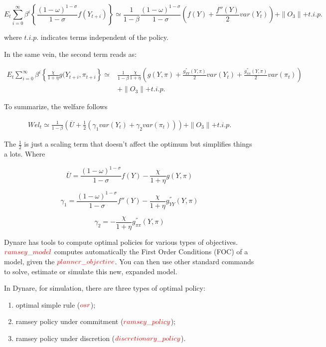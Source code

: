 \documentclass[cn,10pt,math=newtx,citestyle=gb7714-2015,bibstyle=gb7714-2015]{elegantbook}
\begin{document}
	$$E_t \sum_{i=0}^{\infty}\beta^i\left\{\frac{(1-\omega)^{1-\sigma}}{1-\sigma}f(Y_{t+i})\right\}\simeq \frac{1}{1-\beta}\frac{(1-\omega)^{1-\sigma}}{1-\sigma}\left(f(Y)+\frac{f''(Y)}{2}var(Y_t)\right)+\parallel O_3\parallel+t.i.p.$$
	
	where $t.i.p.$ indicates terms independent of the policy.
	
	In the same vein, the second term reads as:
	
	\begin{equation*}
		\begin{split}
			E_t \sum_{i=0}^{\infty}\beta^i\left\{\frac{\chi}{1+\eta}g(Y_{t+i},\pi_{t+i}\right\}\simeq & \frac{1}{1-\beta}\frac{\chi}{1+\eta}\left(g(Y,\pi)+\frac{g_{YY}^{''}(Y,\pi)}{2}var(Y_t)+\frac{g_{\pi \pi}^{''}(Y,\pi)}{2}var(\pi_t)\right)\\
			&+\parallel O_3\parallel+t.i.p.
		\end{split}
	\end{equation*}
	
	To summarize, the welfare follows
	
	\begin{equation*}
		\begin{split}
			Wel_t \simeq  \frac{1}{1-\beta}\left(\overline{U}+\frac{1}{2}\left(\gamma_1 var(Y_t)+\gamma_2 var(\pi_t)\right) \right)+\parallel O_3\parallel+t.i.p.
		\end{split}
	\end{equation*}
	
	The $\frac{1}{2}$ is just a scaling term that doesn't affect the optimum but simplifies things a lots. Where
	
	$$\overline{U}=\frac{(1-\omega)^{1-\sigma}}{1-\sigma}f(Y)-\frac{\chi}{1+\eta}g(Y,\pi)$$
	
	$$\gamma_1=\frac{(1-\omega)^{1-\sigma}}{1-\sigma}f''(Y)-\frac{\chi}{1+\eta}g_{YY}^{''}(Y,\pi)$$
	
	$$\gamma_2=-\frac{\chi}{1+\eta}g_{\pi \pi}^{''}(Y,\pi)$$
	
	Dynare has tools to compute optimal policies for various types of objectives. $\textcolor{red}{ramsey\_model}$ computes automatically the First Order Conditions (FOC) of a model, given the $\textcolor{red}{planner\_objective}$. You can then use other standard commands to solve, estimate or simulate this new, expanded model.
	
	In Dynare, for simulation, there are three types of optimal policy:
	
	\begin{enumerate}
		\item optimal simple rule ($\textcolor{red}{osr}$);
		\item ramsey policy under commitment ($\textcolor{red}{ramsey\_policy}$);
		\item ramsey policy under discretion ($\textcolor{red}{discretionary\_policy}$).
	\end{enumerate}
	
\end{document}
